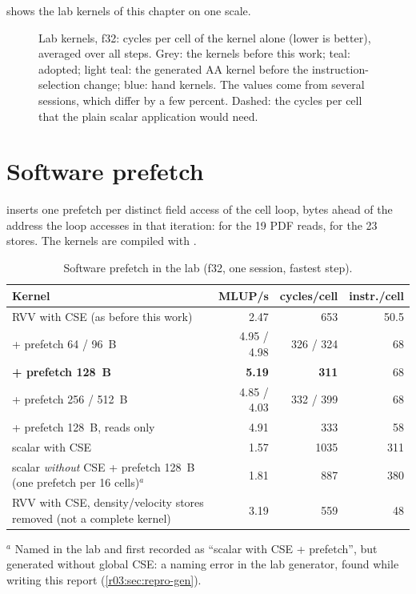  shows the lab kernels of this chapter on one scale.

\begin{figure}[htbp]
  \centering
  
  \caption[Lab kernels on one scale]{Lab kernels, f32: cycles per cell of the kernel alone
    (lower is better), averaged over all steps. Grey: the kernels before this work; teal:
    adopted; light teal: the generated AA kernel before the instruction-selection change; blue:
    hand kernels. The values come from several sessions, which differ by a few percent. Dashed:
    the cycles per cell that  the plain scalar application would need.}\label{r03:fig:ladder}
\end{figure}

\section{Software prefetch}\label{r03:sec:lever-pf}

 inserts one prefetch per distinct field access of the cell loop, 
bytes ahead of the address the loop accesses in that iteration:  for the 19
PDF reads,  for the 23 stores. The kernels are compiled with
.

\begin{table}[htbp]
  \centering\small
  \caption{Software prefetch in the lab (f32, one session, fastest step).}\label{r03:tab:pf}
  \begin{tabularx}{\linewidth}{@{}Xrrr@{}}
    \toprule
    \textbf{Kernel} & \textbf{MLUP/s} & \textbf{cycles/cell} & \textbf{instr./cell}\\
    \midrule
    RVV with CSE (as before this work) & 2.47 & 653 & 50.5\\
    + prefetch 64 / 96~B & 4.95 / 4.98 & 326 / 324 & 68\\
    \textbf{+ prefetch 128~B} & \textbf{5.19} & \textbf{311} & 68\\
    + prefetch 256 / 512~B & 4.85 / 4.03 & 332 / 399 & 68\\
    + prefetch 128~B, reads only & 4.91 & 333 & 58\\
    scalar with CSE & 1.57 & 1035 & 311\\
    scalar \emph{without} CSE + prefetch 128~B (one prefetch per 16 cells)$^{a}$ & 1.81 & 887 & 380\\
    RVV with CSE, density/velocity stores removed (not a complete kernel) & 3.19 & 559 & 48\\
    \bottomrule
  \end{tabularx}

  \smallskip
  \begin{minipage}{0.92\linewidth}\footnotesize
    $^{a}$ Named  in the lab and first recorded as ``scalar
    with CSE + prefetch'', but generated without global CSE: a naming error in the lab generator,
    found while writing this report (\cref{r03:sec:repro-gen}).
  \end{minipage}
\end{table}

